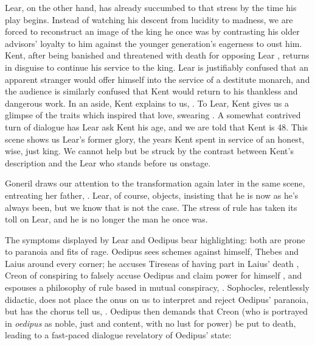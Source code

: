 Lear, on the other hand, has already succumbed to that stress by the time his
play begins. Instead of watching his descent from lucidity to madness, we are
forced to reconstruct an image of the king he once was by contrasting his older
advisors' loyalty to him against the younger generation's eagerness to oust
him. Kent, after being banished and threatened with death for opposing Lear
\parencite[1.1]{lear}, returns in disguise to continue his service to the
king. Lear is justifiably confused that an apparent stranger would offer himself
into the service of a destitute monarch, and the audience is similarly confused
that Kent would return to his thankless and dangerous work. In an aside, Kent
explains to us, . To Lear, Kent gives us a glimpse of the
traits which inspired that love, swearing . A somewhat contrived turn of
dialogue has Lear ask Kent his age, and we are told that Kent is 48. This scene
shows us Lear's former glory, the years Kent spent in service of an honest,
wise, just king. We cannot help but be struck by the contrast between Kent's
description and the Lear who stands before us onstage.

Goneril draws our attention to the transformation again later in the same scene,
entreating her father, . Lear, of course, objects,
insisting that he is now as he's always been, but we know that is not the
case. The stress of rule has taken its toll on Lear, and he is no longer the man
he once was.

The symptoms displayed by Lear and Oedipus bear highlighting: both are prone to
paranoia and fits of rage. Oedipus sees schemes against himself, Thebes and
Laius around every corner; he accuses Tireseas of having part in Laius' death
\parencite[ll. 345--349]{oedipus}, Creon of conspiring to falsely accuse Oedipus
and claim power for himself \parencite[ll. 385--389, 399--402,
572--573]{oedipus}, and espouses a philosophy of rule based in mutual
conspiracy, . Sophocles, relentlessly didactic, does not place the onus on us to
interpret and reject Oedipus' paranoia, but has the chorus tell us,
. Oedipus then demands that
Creon (who is portrayed in \textit{oedipus} as noble, just and content, with no
lust for power) be put to death, leading to a fast-paced dialogue revelatory of
Oedipus' state:

